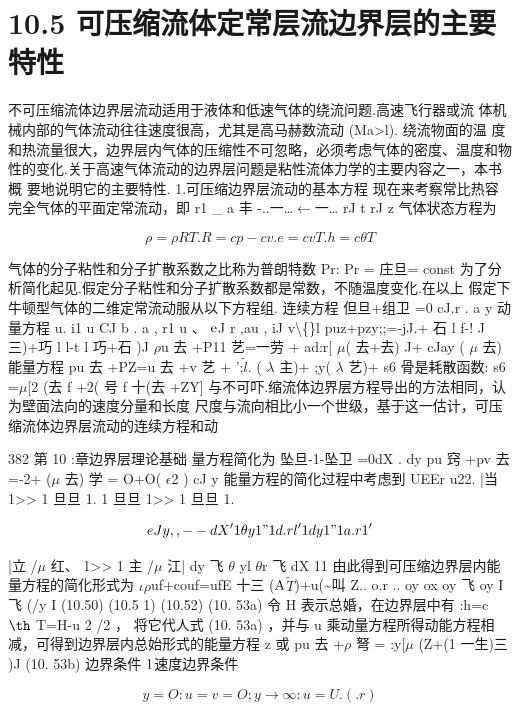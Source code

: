 \section*{10.5  可压缩流体定常层流边界层的主要特性}

不可压缩流体边界层流动适用于液体和低速气体的绕流问题.高速飞行器或流 体机械内部的气体流动往往速度很高，尤其是高马赫数流动 (Ma>l). 绕流物面的温 度和热流量很大，边界层内气体的压缩性不可忽略，必须考虑气体的密度、温度和物 性的变化.关于高速气体流动的边界层问题是粘性流体力学的主要内容之一，本书概 要地说明它的主要特性. 1.可压缩边界层流动的基本方程 现在来考察常比热容完全气体的平面定常流动，即 r1 \_ a 丰 -..一…$\leftarrow$一… rJ t rJ z 气体状态方程为

\[\rho =\rho RT. R=cp-cv. e=cvT. h=c\theta T\]

气体的分子粘性和分子扩散系数之比称为普朗特数 Pr: Pr = 庄旦= const 为了分析简化起见.假定分子粘性和分子扩散系数都是常数，不随温度变化.在以上 假定下牛顿型气体的二维定常流动服从以下方程组. 连续方程 但旦+组卫 =0 cJ.r . a y 动量方程 u. i1 u CJ b . a , r1 u 、 ${\rm e}$J r ,au , iJ v\textbackslash\{\}l puz+pzy;;=-jJ.+ 石 l f-! J三)+巧 l l-t l 巧+石 )J $\rho$u 去 +P11 艺=一劳 + ad:r[ $\mu$( 去+去) J+ cJay ( $\mu$ 去) 能量方程 pu 去 +PZ=u 去 +v 艺 + ';$\tilde{l}$. ( $\lambda$ 主)+ ;y( $\lambda$ 艺)+ s6 骨是耗散函数: s6 =$\mu$[2 (去 f +2( 号 f 十(去 +ZY] 与不可吓.缩流体边界层方程导出的方法相同，认为壁面法向的速度分量和长度 尺度与流向相比小一个世级，基于这一估计，可压缩流体边界层流动的连续方程和动

382 第 10 :章边界层理论基础 量方程简化为 坠旦-1-坠卫 =0dX . dy pu 窍 +pv 去 =-2+  ($\mu$ 去) 学 = O+O( $\epsilon$2 ) cJ y 能量方程的简化过程中考虑到 UEEr u22. |当 1>> 1 旦旦 1. 1 旦旦 1>> 1 旦旦 1.

\[eJ y ,,-- dX' 1\theta  y 1" 1 d.r l' 1 dy 1" 1 a.r 1 '\]

|立 /$\mu$ 红、 1>> 1 主 /$\mu$ 江| dy 飞 $\theta$ yl $\theta$r 飞 dX 11 由此得到可压缩边界层内能量方程的简化形式为 $\iota$$\rho$uf+couf=ufE 十三 (${\rm A}$$\tilde{T}$)+u(\textasciitilde{}叫 Z.. o.r .. oy ox oy 飞 oy I 飞 (/y I (10.50) (10.5 1) (10.52) (10. 53a) 令 H 表示总婚，在边界层中有 :h=c ${\rm þ}$ T=H-u 2 /2 ， 将它代人式 (10. 53a) ，并与 u 乘动量方程所得动能方程相减，可得到边界层内总始形式的能量方程 z 或 pu 去 +$\rho$ 弩 = :y[$\mu$  (Z+(1 一生)三 )J (10. 53b) 边界条件 ${\rm 1}$速度边界条件

\begin{equation*}y=O:u=v=O; y \rightarrow \infty  : u=U.( .r)\tag{10.54}\end{equation*}

